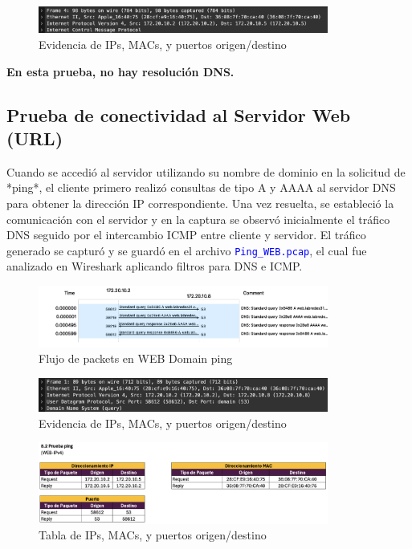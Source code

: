 \documentclass[10pt]{article}
\begin{document}
\begin{figure}[H]
    \centering
    \includegraphics[width=0.85\textwidth]{lab-02-screenshots/8.2-WEB-IP-data}
    \caption{Evidencia de IPs, MACs, y puertos origen/destino}
\end{figure}

\textbf{En esta prueba, no hay resolución DNS.}

\subsection{Prueba de conectividad al Servidor Web (URL)}
Cuando se accedió al servidor utilizando su nombre de dominio en la solicitud de *ping*, el cliente primero realizó consultas de tipo A y AAAA al servidor DNS para obtener la dirección IP correspondiente. Una vez resuelta, se estableció la comunicación con el servidor y en la captura se observó inicialmente el tráfico DNS seguido por el intercambio ICMP entre cliente y servidor. El tráfico generado se capturó y se guardó en el archivo \textcolor{blue}{\texttt{Ping\_WEB.pcap}}, el cual fue analizado en Wireshark aplicando filtros para DNS e ICMP.


\begin{figure}[H]
    \centering
    \includegraphics[width=0.85\textwidth]{lab-02-screenshots/8.2-WEB-flow}
    \caption{Flujo de packets en WEB Domain ping}
\end{figure}


\begin{figure}[H]
    \centering
    \includegraphics[width=0.85\textwidth]{lab-02-screenshots/8.2-WEB-data}
    \caption{Evidencia de IPs, MACs, y puertos origen/destino}
\end{figure}


\begin{figure}[H]
    \centering
    \includegraphics[width=0.85\textwidth]{lab-02-screenshots/8.2-WEB-IP-table}
    \caption{Tabla de IPs, MACs, y puertos origen/destino}
\end{figure}
\end{document}

